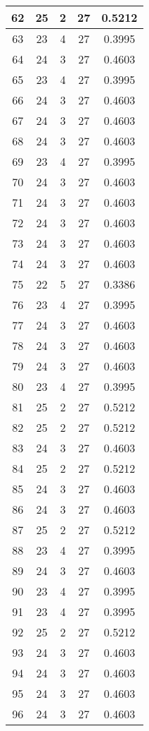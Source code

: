 \documentclass[letterpaper, 12pt]{article}
\begin{document}
\begin{longtable}{|c|c|c|c|c|}
\hline
62 & 25 & 2 & 27 & 0.5212 \\
\hline
63 & 23 & 4 & 27 & 0.3995 \\
\hline
64 & 24 & 3 & 27 & 0.4603 \\
\hline
65 & 23 & 4 & 27 & 0.3995 \\
\hline
66 & 24 & 3 & 27 & 0.4603 \\
\hline
67 & 24 & 3 & 27 & 0.4603 \\
\hline
68 & 24 & 3 & 27 & 0.4603 \\
\hline
69 & 23 & 4 & 27 & 0.3995 \\
\hline
70 & 24 & 3 & 27 & 0.4603 \\
\hline
71 & 24 & 3 & 27 & 0.4603 \\
\hline
72 & 24 & 3 & 27 & 0.4603 \\
\hline
73 & 24 & 3 & 27 & 0.4603 \\
\hline
74 & 24 & 3 & 27 & 0.4603 \\
\hline
75 & 22 & 5 & 27 & 0.3386 \\
\hline
76 & 23 & 4 & 27 & 0.3995 \\
\hline
77 & 24 & 3 & 27 & 0.4603 \\
\hline
78 & 24 & 3 & 27 & 0.4603 \\
\hline
79 & 24 & 3 & 27 & 0.4603 \\
\hline
80 & 23 & 4 & 27 & 0.3995 \\
\hline
81 & 25 & 2 & 27 & 0.5212 \\
\hline
82 & 25 & 2 & 27 & 0.5212 \\
\hline
83 & 24 & 3 & 27 & 0.4603 \\
\hline
84 & 25 & 2 & 27 & 0.5212 \\
\hline
85 & 24 & 3 & 27 & 0.4603 \\
\hline
86 & 24 & 3 & 27 & 0.4603 \\
\hline
87 & 25 & 2 & 27 & 0.5212 \\
\hline
88 & 23 & 4 & 27 & 0.3995 \\
\hline
89 & 24 & 3 & 27 & 0.4603 \\
\hline
90 & 23 & 4 & 27 & 0.3995 \\
\hline
91 & 23 & 4 & 27 & 0.3995 \\
\hline
92 & 25 & 2 & 27 & 0.5212 \\
\hline
93 & 24 & 3 & 27 & 0.4603 \\
\hline
94 & 24 & 3 & 27 & 0.4603 \\
\hline
95 & 24 & 3 & 27 & 0.4603 \\
\hline
96 & 24 & 3 & 27 & 0.4603 \\

\end{longtable}
\end{document}
